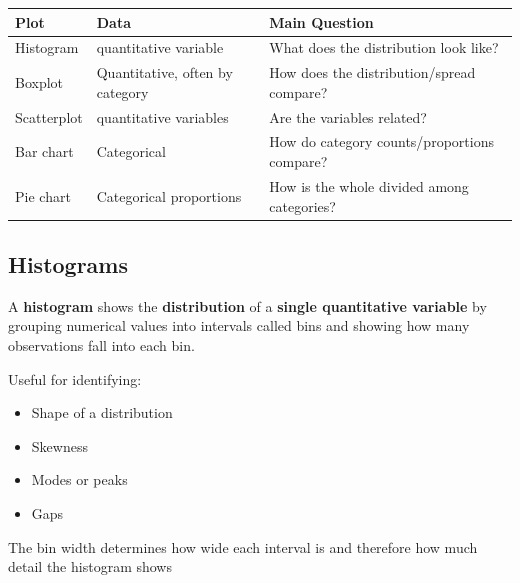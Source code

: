 \documentclass[
  letterpaper,
  DIV=11,
  numbers=noendperiod]{scrreprt}
\newcounter{none} %
\providecommand{\tightlist}{%
  \setlength{\itemsep}{0pt}\setlength{\parskip}{0pt}}
\begin{document}
{\def\LTcaptype{none} %
\begin{longtable}[]{@{}
  >{\raggedright\arraybackslash}p{}
  >{\raggedright\arraybackslash}p{}
  >{\raggedright\arraybackslash}p{}@{}}
\toprule\noalign{}
\begin{minipage}[b]{\linewidth}\raggedright
Plot
\end{minipage} & \begin{minipage}[b]{\linewidth}\raggedright
Data
\end{minipage} & \begin{minipage}[b]{\linewidth}\raggedright
Main Question
\end{minipage} \\
\midrule\noalign{}
\endhead
\bottomrule\noalign{}
\endlastfoot
Histogram & 1 quantitative variable & What does the distribution look
like? \\
Boxplot & Quantitative, often by category & How does the
distribution/spread compare? \\
Scatterplot & 2 quantitative variables & Are the variables related? \\
Bar chart & Categorical & How do category counts/proportions compare? \\
Pie chart & Categorical proportions & How is the whole divided among
categories? \\
\end{longtable}
}

\subsection{Histograms}\label{histograms}

A \textbf{histogram} shows the \textbf{distribution} of a \textbf{single
quantitative variable} by grouping numerical values into intervals
called bins and showing how many observations fall into each bin.

Useful for identifying:

\begin{itemize}
\tightlist
\item
  Shape of a distribution
\item
  Skewness
\item
  Modes or peaks
\item
  Gaps
\end{itemize}

The bin width determines how wide each interval is and therefore how
much detail the histogram shows
\end{document}
